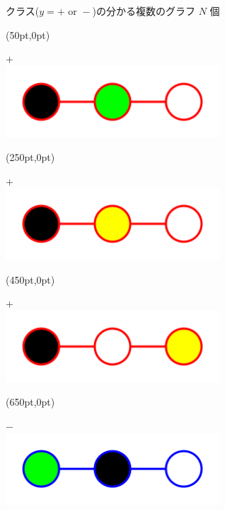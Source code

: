 \begin{tcolorbox}[title={\Large グラフの教師あり分類問題}]
	クラス($ y = \plus \mbox{~or~} \minus $)の分かる複数のグラフ $N$ 個
	\vspace{20px}

	\begin{textblock*}{0.2\textwidth}(50pt,0pt)
		\begin{center}
			$\plus$ \\
			\includegraphics[width=0.6\textwidth]{img/graph/g01r.png}
		\end{center}
	\end{textblock*}

	\begin{textblock*}{0.2\textwidth}(250pt,0pt)
		\begin{center}
			$\plus$ \\
			\includegraphics[width=0.6\textwidth]{img/graph/g02r.png}
		\end{center}
	\end{textblock*}

	\begin{textblock*}{0.2\textwidth}(450pt,0pt)
		\begin{center}
			$\plus$ \\
			\includegraphics[width=0.6\textwidth]{img/graph/g03r.png}
		\end{center}
	\end{textblock*}

	\begin{textblock*}{0.2\textwidth}(650pt,0pt)
		\begin{center}
			$\minus$ \\
			\includegraphics[width=0.6\textwidth]{img/graph/g04b.png}
		\end{center}
	\end{textblock*}


\end{tcolorbox}
